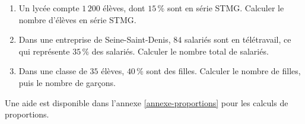 \documentclass[10pt,a4paper]{article}
\begin{document}
\begin{bloc}
\begin{exo}
\begin{enumerate}[leftmargin=*]
    \item Un lycée compte \(1\,200\) élèves, dont \(15\,\%\) sont en série STMG. Calculer le nombre d'élèves en série STMG.
    \item Dans une entreprise de Seine-Saint-Denis, \(84\) salariés sont en télétravail, ce qui représente \(35\,\%\) des salariés. Calculer le nombre total de salariés.
    \item Dans une classe de \(35\) élèves, \(40\,\%\) sont des filles. Calculer le nombre de filles, puis le nombre de garçons.
\end{enumerate}
\end{exo}

\begin{indication}
    Une aide est disponible dans l'annexe \ref{annexe-proportions} pour les calculs de proportions.
\end{indication}
\end{bloc}
\end{document}
